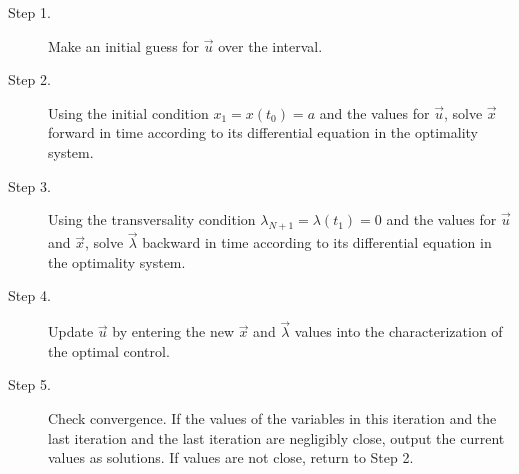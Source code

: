 \begin{description}
	\item[Step 1.]
    	Make an initial guess for $\vec{u}$ over the interval.
    \item[Step 2.]
    	Using the initial condition $x_1 = x(t_0) = a$ and the values for 
        $\vec{u}$, solve $\vec{x}$ forward in time according to its differential
        equation in the optimality system.
	\item[Step 3.]
    	Using the transversality condition $\lambda_{N+1} = \lambda(t_1) = 0$ 
        and the values for $\vec{u}$ and $\vec{x}$, solve $\vec{\lambda}$ 
        backward in time according to its differential equation in the optimality
        system.
    \item[Step 4.]
    	Update $\vec{u}$ by entering the new $\vec{x}$ and $\vec{\lambda}$ values 
        into the characterization of the optimal control. 
	\item[Step 5.]
    	Check convergence. If the values of the variables in this iteration and 
        the last iteration and the last iteration are negligibly close, output the 
        current values as solutions. If values are not close, return to Step 2.
\end{description}


